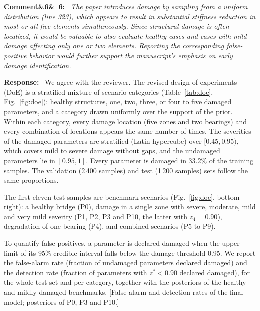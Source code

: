 \documentclass[11pt]{article}
\newenvironment{rcomment}[1]{\par\bigskip\noindent\textbf{Comment\ifx&#1&\else\ #1\fi:}\ \itshape}{\par}
\newenvironment{response}{\par\smallskip\noindent\color{resp}\textbf{Response:}\ }{\par}
\newcommand{\tbd}[1]{\textcolor{note}{\textsf{[#1]}}}
\begin{document}
\begin{rcomment}{6}
The paper introduces damage by sampling from a uniform distribution (line 323), which appears to result in substantial
stiffness reduction in most or all five elements simultaneously. Since structural damage is often localized, it would be
valuable to also evaluate healthy cases and cases with mild damage affecting only one or two elements. Reporting the
corresponding false-positive behavior would further support the manuscript's emphasis on early damage identification.
\end{rcomment}

\begin{response}
We agree with the reviewer. The revised design of experiments (DoE) is a stratified mixture of scenario categories
(Table~\ref{tab:doe}, Fig.~\ref{fig:doe}): healthy structures, one, two, three, or four to five damaged parameters, and a
category drawn uniformly over the support of the prior. Within each category, every damage location (five zones and two
bearings) and every combination of locations appears the same number of times. The severities of the damaged
parameters are stratified (Latin hypercube) over $[0.45,0.95)$, which covers mild to severe damage without gaps, and
the undamaged parameters lie in $[0.95,1]$. Every parameter is damaged in 33.2\% of the training samples. The validation
(2\,400 samples) and test (1\,200 samples) sets follow the same proportions.

The first eleven test samples are benchmark scenarios (Fig.~\ref{fig:doe}, bottom right): a healthy bridge (P0),
damage in a single zone with severe, moderate, mild and very mild severity (P1, P2, P3 and P10, the latter with
$z_4=0.90$), degradation of one bearing (P4), and combined scenarios (P5 to P9).

To quantify false positives, a parameter is declared damaged when the upper limit of its 95\% credible interval falls
below the damage threshold 0.95. We report the false-alarm rate (fraction of undamaged parameters declared damaged)
and the detection rate (fraction of parameters with $z^*<0.90$ declared damaged), for the whole test set and per
category, together with the posteriors of the healthy and mildly damaged benchmarks.
\tbd{False-alarm and detection rates of the final model; posteriors of P0, P3 and P10.}
\end{response}
\end{document}
